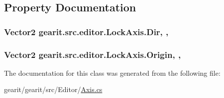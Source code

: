 \subsection{Property Documentation}
\hypertarget{classgearit_1_1src_1_1editor_1_1_lock_axis_a5e8a95cd52bffdf165600f53294194a9}{
\subsubsection[{Dir}]{\setlength{\rightskip}{0pt plus 5cm}Vector2 gearit.\+src.\+editor.\+Lock\+Axis.\+Dir\hspace{0.3cm}{\ttfamily [static]}, {\ttfamily [get]}, {\ttfamily [set]}}}\label{classgearit_1_1src_1_1editor_1_1_lock_axis_a5e8a95cd52bffdf165600f53294194a9}
\hypertarget{classgearit_1_1src_1_1editor_1_1_lock_axis_a02c68e1cea8095e45e7d99dfeeed5e3f}{
\subsubsection[{Origin}]{\setlength{\rightskip}{0pt plus 5cm}Vector2 gearit.\+src.\+editor.\+Lock\+Axis.\+Origin\hspace{0.3cm}{\ttfamily [static]}, {\ttfamily [get]}, {\ttfamily [set]}}}\label{classgearit_1_1src_1_1editor_1_1_lock_axis_a02c68e1cea8095e45e7d99dfeeed5e3f}


The documentation for this class was generated from the following file\+:\begin{DoxyCompactItemize}
\item 
gearit/gearit/src/\+Editor/\hyperlink{_axis_8cs}{Axis.\+cs}\end{DoxyCompactItemize}
